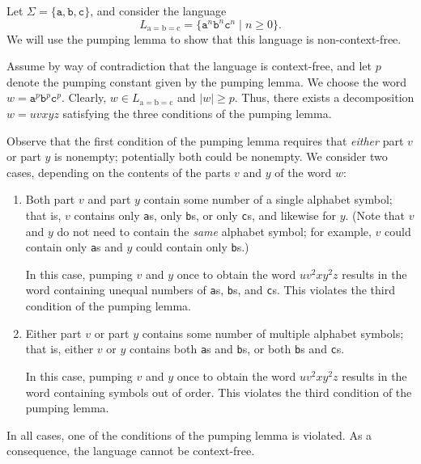 \begin{example}
Let $\Sigma = \{\texttt{a}, \texttt{b}, \texttt{c}\}$, and consider the language
\begin{equation*}
L_{\text{a}=\text{b}=\text{c}} = \{\texttt{a}^{n}\texttt{b}^{n}\texttt{c}^{n} \mid n \geq 0\}.
\end{equation*}
We will use the pumping lemma to show that this language is non-context-free.

Assume by way of contradiction that the language is context-free, and let $p$ denote the pumping constant given by the pumping lemma. We choose the word $w = \texttt{a}^{p}\texttt{b}^{p}\texttt{c}^{p}$. Clearly, $w \in L_{\text{a}=\text{b}=\text{c}}$ and $|w| \geq p$. Thus, there exists a decomposition $w = uvxyz$ satisfying the three conditions of the pumping lemma.

Observe that the first condition of the pumping lemma requires that \emph{either} part $v$ or part $y$ is nonempty; potentially both could be nonempty. We consider two cases, depending on the contents of the parts $v$ and $y$ of the word $w$:
\begin{enumerate}
\item Both part $v$ and part $y$ contain some number of a single alphabet symbol; that is, $v$ contains only \texttt{a}s, only \texttt{b}s, or only \texttt{c}s, and likewise for $y$. (Note that $v$ and $y$ do not need to contain the \emph{same} alphabet symbol; for example, $v$ could contain only \texttt{a}s and $y$ could contain only \texttt{b}s.)

In this case, pumping $v$ and $y$ once to obtain the word $uv^{2}xy^{2}z$ results in the word containing unequal numbers of \texttt{a}s, \texttt{b}s, and \texttt{c}s. This violates the third condition of the pumping lemma.

\item Either part $v$ or part $y$ contains some number of multiple alphabet symbols; that is, either $v$ or $y$ contains both \texttt{a}s and \texttt{b}s, or both \texttt{b}s and \texttt{c}s.

In this case, pumping $v$ and $y$ once to obtain the word $uv^{2}xy^{2}z$ results in the word containing symbols out of order. This violates the third condition of the pumping lemma.
\end{enumerate}

In all cases, one of the conditions of the pumping lemma is violated. As a consequence, the language cannot be context-free.
\end{example}

